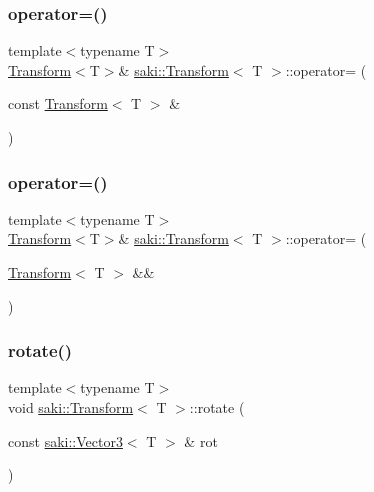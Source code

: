\subsubsection{\texorpdfstring{operator=()}{operator=()}\hspace{0.1cm}{\footnotesize\ttfamily [1/2]}}
{\footnotesize\ttfamily template$<$typename T$>$ \\
\mbox{\hyperlink{classsaki_1_1_transform}{Transform}}$<$T$>$\& \mbox{\hyperlink{classsaki_1_1_transform}{saki\+::\+Transform}}$<$ T $>$\+::operator= (\begin{DoxyParamCaption}\item[{const \mbox{\hyperlink{classsaki_1_1_transform}{Transform}}$<$ T $>$ \&}]{ }\end{DoxyParamCaption})\hspace{0.3cm}{\ttfamily [default]}}

\mbox{\label{classsaki_1_1_transform_a66ea10234a845d96e63bbb9c2a1050eb}} 
\subsubsection{\texorpdfstring{operator=()}{operator=()}\hspace{0.1cm}{\footnotesize\ttfamily [2/2]}}
{\footnotesize\ttfamily template$<$typename T$>$ \\
\mbox{\hyperlink{classsaki_1_1_transform}{Transform}}$<$T$>$\& \mbox{\hyperlink{classsaki_1_1_transform}{saki\+::\+Transform}}$<$ T $>$\+::operator= (\begin{DoxyParamCaption}\item[{\mbox{\hyperlink{classsaki_1_1_transform}{Transform}}$<$ T $>$ \&\&}]{ }\end{DoxyParamCaption})\hspace{0.3cm}{\ttfamily [default]}}

\mbox{\label{classsaki_1_1_transform_adf6071b145056f24ca2a456bb4331999}} 
\subsubsection{\texorpdfstring{rotate()}{rotate()}\hspace{0.1cm}{\footnotesize\ttfamily [1/2]}}
{\footnotesize\ttfamily template$<$typename T$>$ \\
void \mbox{\hyperlink{classsaki_1_1_transform}{saki\+::\+Transform}}$<$ T $>$\+::rotate (\begin{DoxyParamCaption}\item[{const \mbox{\hyperlink{classsaki_1_1_vector3}{saki\+::\+Vector3}}$<$ T $>$ \&}]{rot }\end{DoxyParamCaption})\hspace{0.3cm}{\ttfamily [inline]}}



